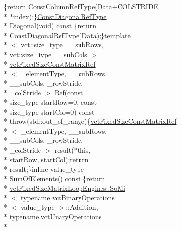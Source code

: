 \begin{DoxyCompactItemize}
\{return \hyperlink{classvct_fixed_size_const_matrix_base_a68ed47f84a2855832fa0c18fafda6843}{Const\-Column\-Ref\-Type}(Data+\hyperlink{classvct_fixed_size_const_matrix_base_a0aa9b864b8810dd6a50640c965564bd0aee4513ad3dee685fdda1bc2c264be993}{C\-O\-L\-S\-T\-R\-I\-D\-E} \\*
$\ast$index);\}\hyperlink{classvct_fixed_size_const_matrix_base_a54699d7dbe28072365fab4aa99c68d66}{Const\-Diagonal\-Ref\-Type} \\*
Diagonal(void) const \{return \\*
\hyperlink{classvct_fixed_size_const_matrix_base_a54699d7dbe28072365fab4aa99c68d66}{Const\-Diagonal\-Ref\-Type}(Data);\}template\\*
$<$ \hyperlink{namespacevct_a3e2935e13aac4500965e00d30565775b}{vct\-::size\-\_\-type} \-\_\-\-\_\-sub\-Rows, \\*
\hyperlink{namespacevct_a3e2935e13aac4500965e00d30565775b}{vct\-::size\-\_\-type} \-\_\-\-\_\-sub\-Cols $>$\\*
 \hyperlink{classvct_fixed_size_const_matrix_ref}{vct\-Fixed\-Size\-Const\-Matrix\-Ref}\\*
$<$ \-\_\-element\-Type, \-\_\-\-\_\-sub\-Rows, \\*
\-\_\-\-\_\-sub\-Cols, \-\_\-row\-Stride, \\*
\-\_\-col\-Stride $>$ Ref(const \\*
size\-\_\-type start\-Row=0, const \\*
size\-\_\-type start\-Col=0) const \\*
throw(std\-::out\-\_\-of\-\_\-range)\{\hyperlink{classvct_fixed_size_const_matrix_ref}{vct\-Fixed\-Size\-Const\-Matrix\-Ref}\\*
$<$ \-\_\-element\-Type, \-\_\-\-\_\-sub\-Rows, \\*
\-\_\-\-\_\-sub\-Cols, \-\_\-row\-Stride, \\*
\-\_\-col\-Stride $>$ result($\ast$this, \\*
start\-Row, start\-Col);return \\*
result;\}inline value\-\_\-type \\*
Sum\-Of\-Elements() const \{return \\*
\hyperlink{classvct_fixed_size_matrix_loop_engines_1_1_so_mi}{vct\-Fixed\-Size\-Matrix\-Loop\-Engines\-::\-So\-Mi}\\*
$<$ typename \hyperlink{classvct_binary_operations}{vct\-Binary\-Operations}\\*
$<$ value\-\_\-type $>$\-::Addition, \\*
typename \hyperlink{classvct_unary_operations}{vct\-Unary\-Operations}\\*

\end{DoxyCompactItemize}
